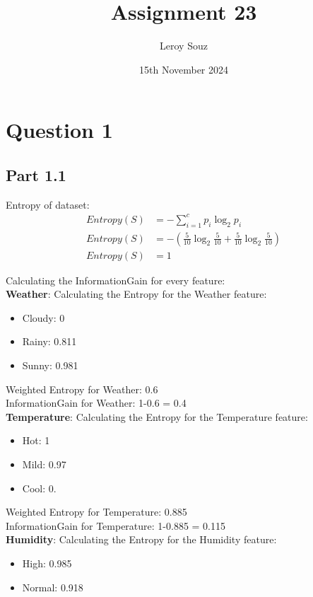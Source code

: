 \documentclass{article}
\title{Assignment 23}
\author{Leroy Souz}
\date{15th November 2024}
\begin{document}
\maketitle

\section{Question 1}

\subsection{Part 1.1}
Entropy of dataset:
\begin{align*}
    Entropy(S) &= -\sum_{i=1}^{c} p_i \log_2 p_i\\
    Entropy(S) &= -\left(\frac{5}{10} \log_2 \frac{5}{10} + \frac{5}{10} \log_2 \frac{5}{10}\right)\\
    Entropy(S) &= 1
\end{align*}

\noindent Calculating the InformationGain for every feature:\\
\textbf{Weather}:
Calculating the Entropy for the Weather feature:
\begin{itemize}
    \item Cloudy: 0
    \item Rainy: 0.811
    \item Sunny: 0.981
\end{itemize}

\noindent Weighted Entropy for Weather: 0.6\\
\noindent InformationGain for Weather: 1-0.6 = 0.4\\


\textbf{Temperature}:
Calculating the Entropy for the Temperature feature:
\begin{itemize}
    \item Hot: 1
    \item Mild: 0.97
    \item Cool: 0.
\end{itemize}

\noindent Weighted Entropy for Temperature: 0.885\\
\noindent InformationGain for Temperature: 1-0.885 = 0.115\\

\textbf{Humidity}:
Calculating the Entropy for the Humidity feature:
\begin{itemize}
    \item High: 0.985
    \item Normal: 0.918
\end{itemize}
\end{document}
